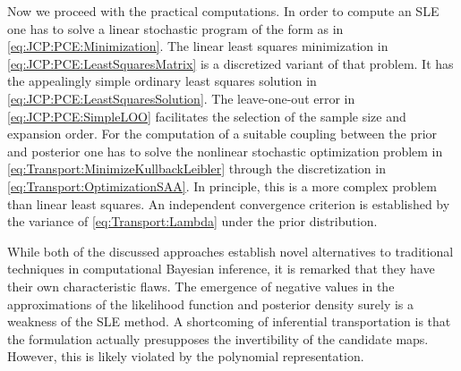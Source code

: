 Now we proceed with the practical computations.
In order to compute an SLE one has to solve a linear stochastic program of the form as in \cref{eq:JCP:PCE:Minimization}.
The linear least squares minimization in \cref{eq:JCP:PCE:LeastSquaresMatrix} is a discretized variant of that problem.
It has the appealingly simple ordinary least squares solution in \cref{eq:JCP:PCE:LeastSquaresSolution}.
The leave-one-out error in \cref{eq:JCP:PCE:SimpleLOO} facilitates the selection of the sample size and expansion order.
For the computation of a suitable coupling between the prior and posterior one has to solve the nonlinear stochastic optimization problem
in \cref{eq:Transport:MinimizeKullbackLeibler} through the discretization in \cref{eq:Transport:OptimizationSAA}.
In principle, this is a more complex problem than linear least squares.
An independent convergence criterion is established by the variance of \cref{eq:Transport:Lambda} under the prior distribution.
\par %
While both of the discussed approaches establish novel alternatives to traditional techniques in computational Bayesian inference,
it is remarked that they have their own characteristic flaws.
The emergence of negative values in the approximations of the likelihood function and posterior density surely is a weakness of the SLE method.
A shortcoming of inferential transportation is that the formulation actually presupposes the invertibility of the candidate maps.
However, this is likely violated by the polynomial representation.